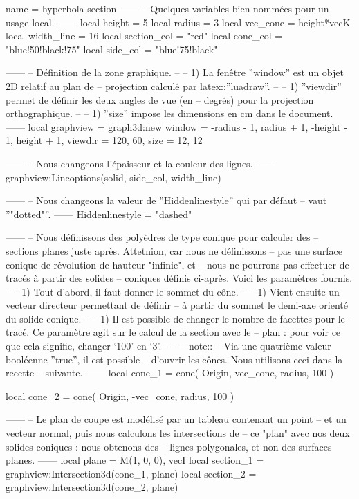 \documentclass{standalone}
\begin{document}
\begin{luadraw}{name = hyperbola-section}
------
-- Quelques variables bien nommées pour un usage local.
------
local height      =  5
local radius      =  3
local vec_cone    = height*vecK
local width_line  =  16
local section_col = "red"
local cone_col    = "blue!50!black!75"
local side_col    = "blue!75!black"

------
-- Définition de la zone graphique.
--
--     1) La fenêtre ''window'' est un objet 2D relatif au plan de
--     projection calculé par latex::''luadraw''.
--
--     1) ''viewdir'' permet de définir les deux angles de vue (en
--     degrés) pour la projection orthographique.
--
--     1) ''size'' impose les dimensions en cm dans le document.
------
local graphview = graph3d:new{
  window  = {-radius - 1, radius + 1, -height - 1, height + 1},
  viewdir = {120, 60},
  size    = {12, 12}
}

------
-- Nous changeons l'épaisseur et la couleur des lignes.
------
graphview:Lineoptions(solid, side_col, width_line)

------
-- Nous changeons la valeur de ''Hiddenlinestyle'' qui par défaut
-- vaut ''"dotted"''.
------
Hiddenlinestyle = "dashed"

------
-- Nous définissons des polyèdres de type conique pour calculer des
-- sections planes juste après. Attetnion, car nous ne définissons
-- pas une surface conique de révolution de hauteur "infinie", et
-- nous ne pourrons pas effectuer de tracés à partir des solides
-- coniques définis ci-après. Voici les paramètres fournis.
--
--     1) Tout d'abord, il faut donner le sommet du cône.
--
--     1) Vient ensuite un vecteur directeur permettant de définir
--     à partir du sommet le demi-axe orienté du solide conique.
--
--     1) Il est possible de changer le nombre de facettes pour le
--     tracé. Ce paramètre agit sur le calcul de la section avec le
--     plan : pour voir ce que cela signifie, changer `100' en `3'.
--
--
-- note::
--     Via une quatrième valeur booléenne ''true'', il est possible
--     d'ouvrir les cônes. Nous utilisons ceci dans la recette
--     suivante.
------
local cone_1 = cone(
  Origin, vec_cone, radius,
  100
)

local cone_2 = cone(
  Origin,  -vec_cone, radius,
  100
)

------
-- Le plan de coupe est modélisé par un tableau contenant un point
-- et un vecteur normal, puis nous calculons les intersections de
-- ce "plan" avec nos deux solides coniques : nous obtenons des
-- lignes polygonales, et non des surfaces planes.
------
local plane     = {M(1, 0, 0), vecI}
local section_1 = graphview:Intersection3d(cone_1, plane)
local section_2 = graphview:Intersection3d(cone_2, plane)


\end{luadraw}
\end{document}
